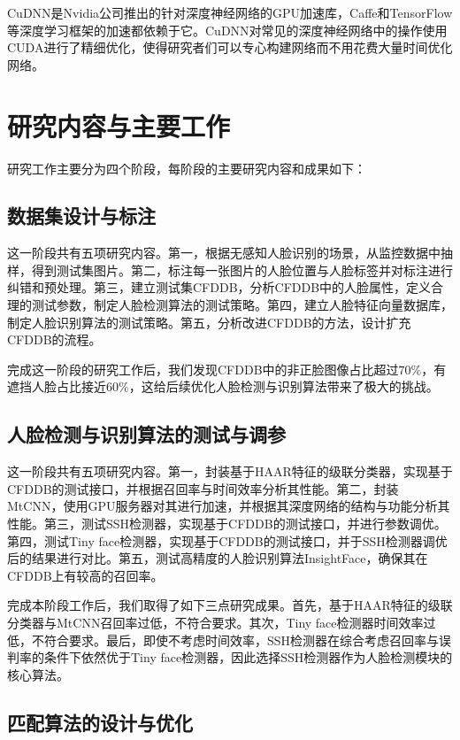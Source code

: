 CuDNN\cite{chetlur2014cudnn}是Nvidia公司推出的针对深度神经网络的GPU加速库，Caffe和TensorFlow等深度学习框架的加速都依赖于它。CuDNN对常见的深度神经网络中的操作使用CUDA进行了精细优化，使得研究者们可以专心构建网络而不用花费大量时间优化网络。

\section{研究内容与主要工作}

研究工作主要分为四个阶段，每阶段的主要研究内容和成果如下：

\subsection{数据集设计与标注}

这一阶段共有五项研究内容。第一，根据无感知人脸识别的场景，从监控数据中抽样，得到测试集图片。第二，标注每一张图片的人脸位置与人脸标签并对标注进行纠错和预处理。第三，建立测试集CFDDB，分析CFDDB中的人脸属性，定义合理的测试参数，制定人脸检测算法的测试策略。第四，建立人脸特征向量数据库，制定人脸识别算法的测试策略。第五，分析改进CFDDB的方法，设计扩充CFDDB的流程。

完成这一阶段的研究工作后，我们发现CFDDB中的非正脸图像占比超过$70\%$，有遮挡人脸占比接近$60\%$，这给后续优化人脸检测与识别算法带来了极大的挑战。

\subsection{人脸检测与识别算法的测试与调参}

这一阶段共有五项研究内容。第一，封装基于HAAR特征的级联分类器\cite{viola2004robust}，实现基于CFDDB的测试接口，并根据召回率与时间效率分析其性能。第二，封装MtCNN\cite{zhang2016joint}，使用GPU服务器对其进行加速，并根据其深度网络的结构与功能分析其性能。第三，测试SSH检测器\cite{najibi2017ssh}，实现基于CFDDB的测试接口，并进行参数调优。第四，测试Tiny face检测器\cite{hu2017finding}，实现基于CFDDB的测试接口，并于SSH检测器调优后的结果进行对比。第五，测试高精度的人脸识别算法InsightFace\cite{deng2018arcface}，确保其在CFDDB上有较高的召回率。

完成本阶段工作后，我们取得了如下三点研究成果。首先，基于HAAR特征的级联分类器与MtCNN召回率过低，不符合要求。其次，Tiny face检测器时间效率过低，不符合要求。最后，即使不考虑时间效率，SSH检测器在综合考虑召回率与误判率的条件下依然优于Tiny face检测器，因此选择SSH检测器作为人脸检测模块的核心算法。

\subsection{匹配算法的设计与优化}

